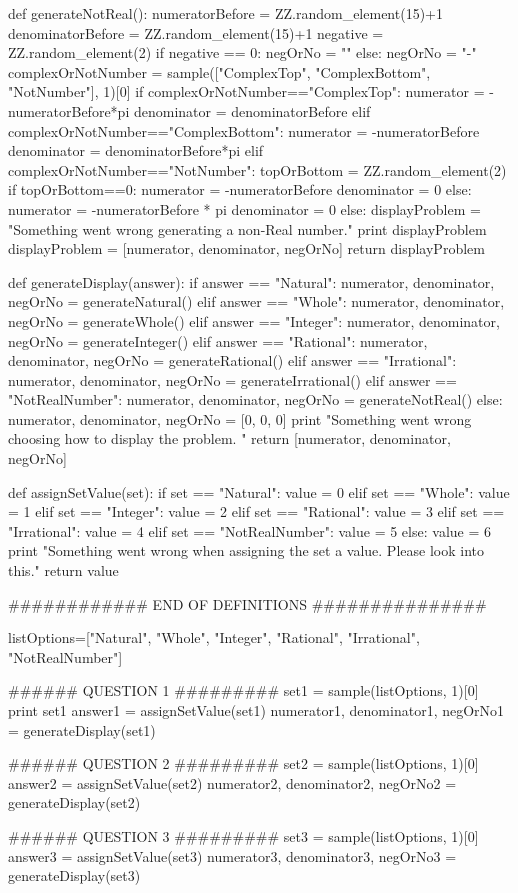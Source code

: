 \documentclass{ximera}
\begin{document}
\begin{sagesilent}
def generateNotReal():
    numeratorBefore = ZZ.random_element(15)+1
    denominatorBefore = ZZ.random_element(15)+1
    negative = ZZ.random_element(2)
    if negative == 0:
        negOrNo = ""
    else:
        negOrNo = "-"
    complexOrNotNumber = sample(["ComplexTop", "ComplexBottom", "NotNumber"], 1)[0]
    if complexOrNotNumber=="ComplexTop":
        numerator = -numeratorBefore*pi
        denominator = denominatorBefore
    elif complexOrNotNumber=="ComplexBottom":
        numerator = -numeratorBefore
        denominator = denominatorBefore*pi
    elif complexOrNotNumber=="NotNumber":
        topOrBottom = ZZ.random_element(2)
        if topOrBottom==0:
            numerator = -numeratorBefore
            denominator = 0
        else:
            numerator = -numeratorBefore * pi
            denominator = 0
    else:
        displayProblem = "Something went wrong generating a non-Real number."
        print displayProblem
    displayProblem = [numerator, denominator, negOrNo]
    return displayProblem

def generateDisplay(answer):
    if answer == "Natural":
        numerator, denominator, negOrNo = generateNatural()
    elif answer == "Whole":
        numerator, denominator, negOrNo = generateWhole()
    elif answer == "Integer":
        numerator, denominator, negOrNo = generateInteger()
    elif answer == "Rational":
        numerator, denominator, negOrNo = generateRational()
    elif answer == "Irrational":
        numerator, denominator, negOrNo = generateIrrational()
    elif answer == "NotRealNumber":
        numerator, denominator, negOrNo = generateNotReal()
    else:
        numerator, denominator, negOrNo = [0, 0, 0]
        print "\n\n\n Something went wrong choosing how to display the problem. \n\n\n\n"
    return [numerator, denominator, negOrNo]

def assignSetValue(set):
    if set == "Natural":
        value = 0
    elif set == "Whole":
        value = 1 
    elif set == "Integer":
        value = 2
    elif set == "Rational":
        value = 3
    elif set == "Irrational":
        value = 4
    elif set == "NotRealNumber":
        value = 5
    else:
        value = 6
        print "Something went wrong when assigning the set a value. Please look into this."
    return value

############ END OF DEFINITIONS ###############

listOptions=["Natural", "Whole", "Integer", "Rational", "Irrational", "NotRealNumber"]

###### QUESTION 1 #########
set1 = sample(listOptions, 1)[0]
print set1
answer1 = assignSetValue(set1)
numerator1, denominator1, negOrNo1 = generateDisplay(set1)

###### QUESTION 2 #########
set2 = sample(listOptions, 1)[0]
answer2 = assignSetValue(set2)
numerator2, denominator2, negOrNo2 = generateDisplay(set2)

###### QUESTION 3 #########
set3 = sample(listOptions, 1)[0]
answer3 = assignSetValue(set3)
numerator3, denominator3, negOrNo3 = generateDisplay(set3)

\end{sagesilent}
\end{document}
